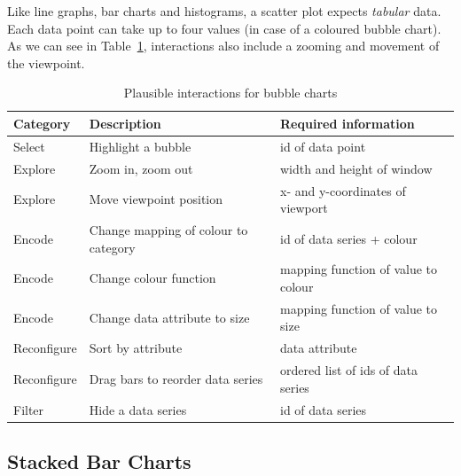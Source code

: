 Like line graphs, bar charts and histograms, a scatter plot expects \emph{tabular} data.
Each data point can take up to four values (in case of a coloured bubble chart).
As we can see in Table~\ref{tab:analysis:bubble-charts:interactions}, interactions also include a zooming and movement of the viewpoint.
\begin{table}[H]
  \caption{Plausible interactions for bubble charts}%
  \label{tab:analysis:bubble-charts:interactions}
  \begin{tabular*}{\textwidth}{lll}
    \bf Category & \bf Description & \bf Required information \\
    \hline
    Select & Highlight a bubble & id of data point \\
    Explore & Zoom in, zoom out & width and height of window \\
    Explore & Move viewpoint position & x- and y-coordinates of viewport \\
    Encode & Change mapping of colour to category & id of data series + colour \\
    Encode & Change colour function & mapping function of value to colour \\
    Encode & Change data attribute to size & mapping function of value to size \\
    Reconfigure & Sort by attribute & data attribute \\
    Reconfigure & Drag bars to reorder data series & ordered list of ids of data series \\
    Filter & Hide a data series & id of data series \\
  \end{tabular*}
\end{table}

\subsection{Stacked Bar Charts}

